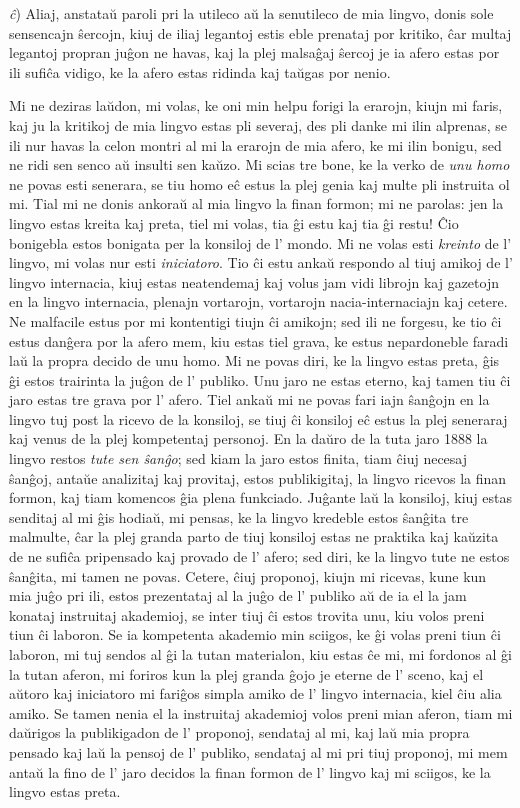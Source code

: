 \documentclass[ngerman,12pt,twoside]{book}
\begin{document}
\emph{ĉ}) Aliaj, anstataŭ paroli pri la utileco aŭ la senutileco de mia lingvo, donis sole sensencajn ŝercojn, kiuj de iliaj legantoj estis eble prenataj por kritiko, ĉar multaj legantoj propran juĝon ne havas, kaj la plej malsaĝaj ŝercoj je ia afero estas por ili sufiĉa vidigo, ke la afero estas \glqq{}ridinda\grqq{} kaj taŭgas por nenio.

Mi ne deziras laŭdon, mi volas, ke oni min helpu forigi la erarojn, kiujn mi faris, kaj ju la kritikoj de mia lingvo estas pli severaj, des pli danke mi ilin alprenas, se ili nur havas la celon montri al mi la erarojn de mia afero, ke mi ilin bonigu, sed ne ridi sen senco aŭ insulti sen kaŭzo. Mi scias tre bone, ke la verko de \emph{unu homo} ne povas esti senerara, se tiu homo eĉ estus la plej genia kaj multe pli instruita ol mi. Tial mi ne donis ankoraŭ al mia lingvo la finan formon; mi ne parolas: \glqq{}jen la lingvo estas kreita kaj preta, tiel mi volas, tia ĝi estu kaj tia ĝi restu!\grqq{} Ĉio bonigebla estos bonigata per la konsiloj de l' mondo. Mi ne volas esti \emph{kreinto} de l' lingvo, mi volas nur esti \emph{iniciatoro}. Tio ĉi estu ankaŭ respondo al tiuj amikoj de l' lingvo internacia, kiuj estas neatendemaj kaj volus jam vidi librojn kaj gazetojn en la lingvo internacia, plenajn vortarojn, vortarojn nacia-internaciajn kaj cetere. Ne malfacile estus por mi kontentigi tiujn ĉi amikojn; sed ili ne forgesu, ke tio ĉi estus danĝera por la afero mem, kiu estas tiel grava, ke estus nepardoneble faradi laŭ la propra decido de unu homo. Mi ne povas diri, ke la lingvo estas preta, ĝis ĝi estos trairinta la juĝon de l' publiko. Unu jaro ne estas eterno, kaj tamen tiu ĉi jaro estas tre grava por l' afero. Tiel ankaŭ mi ne povas fari iajn ŝanĝojn en la lingvo tuj post la ricevo de la konsiloj, se tiuj ĉi konsiloj eĉ estus la plej seneraraj kaj venus de la plej kompetentaj personoj. En la daŭro de la tuta jaro 1888 la lingvo restos \emph{tute sen ŝanĝo}; sed kiam la jaro estos finita, tiam ĉiuj necesaj ŝanĝoj, antaŭe analizitaj kaj provitaj, estos publikigitaj, la lingvo ricevos la finan formon, kaj tiam komencos ĝia plena funkciado. Juĝante laŭ la konsiloj, kiuj estas senditaj al mi ĝis hodiaŭ, mi pensas, ke la lingvo kredeble estos ŝanĝita tre malmulte, ĉar la plej granda parto de tiuj konsiloj estas ne praktika kaj kaŭzita de ne sufiĉa pripensado kaj provado de l' afero; sed diri, ke la lingvo tute ne estos ŝanĝita, mi tamen ne povas. Cetere, ĉiuj proponoj, kiujn mi ricevas, kune kun mia juĝo pri ili, estos prezentataj al la juĝo de l' publiko aŭ de ia el la jam konataj instruitaj akademioj, se inter tiuj ĉi estos trovita unu, kiu volos preni tiun ĉi laboron. Se ia kompetenta akademio min sciigos, ke ĝi volas preni tiun ĉi laboron, mi tuj sendos al ĝi la tutan materialon, kiu estas ĉe mi, mi fordonos al ĝi la tutan aferon, mi foriros kun la plej granda ĝojo je eterne de l' sceno, kaj el aŭtoro kaj iniciatoro mi fariĝos simpla amiko de l' lingvo internacia, kiel ĉiu alia amiko. Se tamen nenia el la instruitaj akademioj volos preni mian aferon, tiam mi daŭrigos la publikigadon de l' proponoj, sendataj al mi, kaj laŭ mia propra pensado kaj laŭ la pensoj de l' publiko, sendataj al mi pri tiuj proponoj, mi mem antaŭ la fino de l' jaro decidos la finan formon de l' lingvo kaj mi sciigos, ke la lingvo estas preta. 
\end{document}
